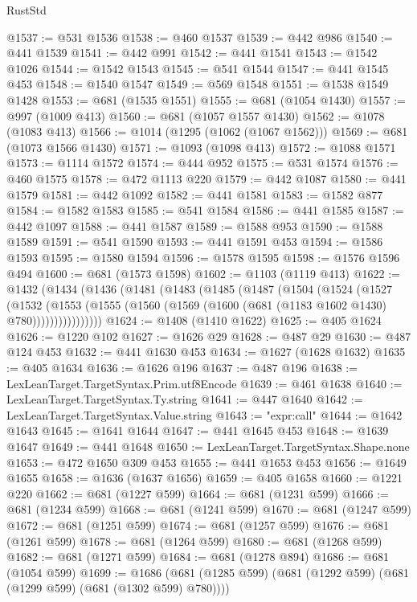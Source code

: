 \begin{lexlean}{RustStd}
\begin{coremodule}
{\begin{coremodule}
{{{{{{{{{{{{{{{{{{{{{{{{{@1537 := @531 @1536
@1538 := @460 @1537
@1539 := @442 @986
@1540 := @441 @1539
@1541 := @442 @991
@1542 := @441 @1541
@1543 := @1542 @1026
@1544 := @1542 @1543
@1545 := @541 @1544
@1547 := @441 @1545 @453
@1548 := @1540 @1547
@1549 := @569 @1548
@1551 := @1538 @1549 @1428
@1553 := @681 (@1535 @1551)
@1555 := @681 (@1054 @1430)
@1557 := @997 (@1009 @413)
@1560 := @681 (@1057 @1557 @1430)
@1562 := @1078 (@1083 @413)
@1566 := @1014 (@1295 (@1062 (@1067 @1562)))
@1569 := @681 (@1073 @1566 @1430)
@1571 := @1093 (@1098 @413)
@1572 := @1088 @1571
@1573 := @1114 @1572
@1574 := @444 @952
@1575 := @531 @1574
@1576 := @460 @1575
@1578 := @472 @1113 @220
@1579 := @442 @1087
@1580 := @441 @1579
@1581 := @442 @1092
@1582 := @441 @1581
@1583 := @1582 @877
@1584 := @1582 @1583
@1585 := @541 @1584
@1586 := @441 @1585
@1587 := @442 @1097
@1588 := @441 @1587
@1589 := @1588 @953
@1590 := @1588 @1589
@1591 := @541 @1590
@1593 := @441 @1591 @453
@1594 := @1586 @1593
@1595 := @1580 @1594
@1596 := @1578 @1595
@1598 := @1576 @1596 @494
@1600 := @681 (@1573 @1598)
@1602 := @1103 (@1119 @413)
@1622 := @1432
    (@1434
      (@1436
        (@1481
          (@1483
            (@1485
              (@1487
                (@1504
                  (@1524
                    (@1527
                      (@1532
                        (@1553
                          (@1555 (@1560 (@1569 (@1600 (@681 (@1183 @1602 @1430) @780))))))))))))))))
@1624 := @1408 (@1410 @1622)
@1625 := @405 @1624
@1626 := @1220 @102
@1627 := @1626 @29
@1628 := @487 @29
@1630 := @487 @124 @453
@1632 := @441 @1630 @453
@1634 := @1627 (@1628 @1632)
@1635 := @405 @1634
@1636 := @1626 @196
@1637 := @487 @196
@1638 := LexLeanTarget.TargetSyntax.Prim.utf8Encode
@1639 := @461 @1638
@1640 := LexLeanTarget.TargetSyntax.Ty.string
@1641 := @447 @1640
@1642 := LexLeanTarget.TargetSyntax.Value.string
@1643 := "expr:call"
@1644 := @1642 @1643
@1645 := @1641 @1644
@1647 := @441 @1645 @453
@1648 := @1639 @1647
@1649 := @441 @1648
@1650 := LexLeanTarget.TargetSyntax.Shape.none
@1653 := @472 @1650 @309 @453
@1655 := @441 @1653 @453
@1656 := @1649 @1655
@1658 := @1636 (@1637 @1656)
@1659 := @405 @1658
@1660 := @1221 @220
@1662 := @681 (@1227 @599)
@1664 := @681 (@1231 @599)
@1666 := @681 (@1234 @599)
@1668 := @681 (@1241 @599)
@1670 := @681 (@1247 @599)
@1672 := @681 (@1251 @599)
@1674 := @681 (@1257 @599)
@1676 := @681 (@1261 @599)
@1678 := @681 (@1264 @599)
@1680 := @681 (@1268 @599)
@1682 := @681 (@1271 @599)
@1684 := @681 (@1278 @894)
@1686 := @681 (@1054 @599)
@1699 := @1686 (@681 (@1285 @599) (@681 (@1292 @599) (@681 (@1299 @599) (@681 (@1302 @599) @780))))
}}}}}}}}}}}}}}}}}}}}}}}}}
\end{coremodule}}
\end{coremodule}
\end{lexlean}
